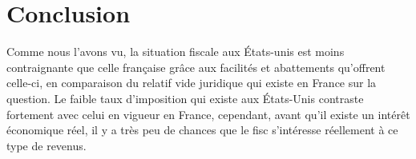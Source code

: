     \section{Conclusion}
        Comme nous l'avons vu, la situation fiscale aux États-unis est moins
        contraignante que celle française grâce aux
        facilités et abattements qu'offrent celle-ci, en comparaison
        du relatif vide juridique qui existe en France sur la question.
        Le faible taux d'imposition qui existe aux États-Unis contraste
        fortement avec celui en vigueur en France, cependant, avant qu'il
        existe un intérêt économique réel, il y a très peu de
        chances que le fisc s'intéresse réellement à ce type de revenus.
